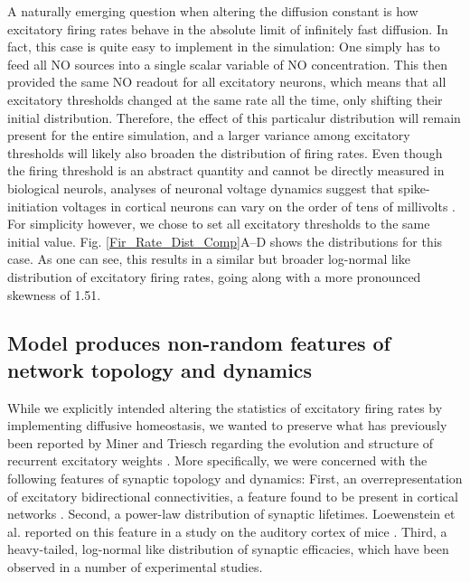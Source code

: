 \documentclass[10pt,letterpaper]{article}
\begin{document}
A naturally emerging question when altering the diffusion constant is how excitatory firing rates behave in the absolute limit of infinitely fast diffusion. In fact, this case is quite easy to implement in the simulation: One simply has to feed all NO sources into a single scalar variable of NO concentration. This then provided the same NO readout for all excitatory neurons, which means that all excitatory thresholds changed at the same rate all the time, only shifting their initial distribution. Therefore, the effect of this particalur distribution will remain present for the entire simulation, and a larger variance among excitatory thresholds will likely also broaden the distribution of firing rates. Even though the firing threshold is an abstract quantity and cannot be directly measured in biological neurols, analyses of neuronal voltage dynamics suggest that spike-initiation voltages in cortical neurons can vary on the order of tens of millivolts \cite{Azouz_2000, Jolivet_2006}. For simplicity however, we chose to set all excitatory thresholds to the same initial value. Fig. \ref{Fir_Rate_Dist_Comp}A--D shows the distributions for this case. As one can see, this results in a similar but broader log-normal like distribution of excitatory firing rates, going along with a more pronounced skewness of 1.51.

\subsection*{Model produces non-random features of network topology and dynamics}\label{Section_Topol_Preservation}
While we explicitly intended altering the statistics of excitatory firing rates by implementing diffusive homeostasis, we wanted to preserve what has previously been reported by Miner and Triesch regarding the evolution and structure of recurrent excitatory weights \cite{SORN_Paper}. More specifically, we were concerned with the following features of synaptic topology and dynamics: First, an overrepresentation of excitatory bidirectional connectivities, a feature found to be present in cortical networks \cite{Song_Connectivity_2005}. Second, a power-law distribution of synaptic lifetimes. Loewenstein et al. reported on this feature in a study on the auditory cortex of mice \cite{Loewenstein_2015}. Third, a heavy-tailed, log-normal like distribution of synaptic efficacies, which have been observed in a number of experimental studies\cite{Song_Connectivity_2005,Yasumatsu_Synapses_2008,Lefort_2009,Loewenstein_Spine_Sizes}.
\end{document}
